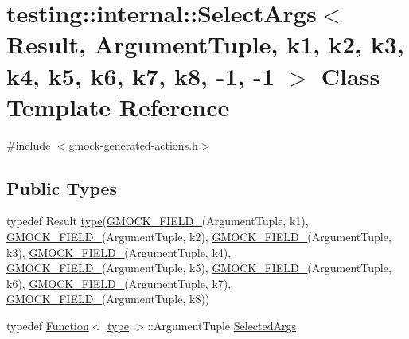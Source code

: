 \hypertarget{classtesting_1_1internal_1_1_select_args_3_01_result_00_01_argument_tuple_00_01k1_00_01k2_00_01ke29a32f440a8fcb098d8685a265f9f40}{}\section{testing\+:\+:internal\+:\+:Select\+Args$<$ Result, Argument\+Tuple, k1, k2, k3, k4, k5, k6, k7, k8, -\/1, -\/1 $>$ Class Template Reference}
\label{classtesting_1_1internal_1_1_select_args_3_01_result_00_01_argument_tuple_00_01k1_00_01k2_00_01ke29a32f440a8fcb098d8685a265f9f40}


{\ttfamily \#include $<$gmock-\/generated-\/actions.\+h$>$}

\subsection*{Public Types}
\begin{DoxyCompactItemize}
\item 
typedef Result \hyperlink{classtesting_1_1internal_1_1_select_args_3_01_result_00_01_argument_tuple_00_01k1_00_01k2_00_01ke29a32f440a8fcb098d8685a265f9f40_a098037b4b2ed4c33121d2e0f1967acbf}{type}(\hyperlink{gmock-generated-actions_8h_a6eb3ce92b0613603057a20ec9e593317}{G\+M\+O\+C\+K\+\_\+\+F\+I\+E\+L\+D\+\_\+}(Argument\+Tuple, k1), \hyperlink{gmock-generated-actions_8h_a6eb3ce92b0613603057a20ec9e593317}{G\+M\+O\+C\+K\+\_\+\+F\+I\+E\+L\+D\+\_\+}(Argument\+Tuple, k2), \hyperlink{gmock-generated-actions_8h_a6eb3ce92b0613603057a20ec9e593317}{G\+M\+O\+C\+K\+\_\+\+F\+I\+E\+L\+D\+\_\+}(Argument\+Tuple, k3), \hyperlink{gmock-generated-actions_8h_a6eb3ce92b0613603057a20ec9e593317}{G\+M\+O\+C\+K\+\_\+\+F\+I\+E\+L\+D\+\_\+}(Argument\+Tuple, k4), \hyperlink{gmock-generated-actions_8h_a6eb3ce92b0613603057a20ec9e593317}{G\+M\+O\+C\+K\+\_\+\+F\+I\+E\+L\+D\+\_\+}(Argument\+Tuple, k5), \hyperlink{gmock-generated-actions_8h_a6eb3ce92b0613603057a20ec9e593317}{G\+M\+O\+C\+K\+\_\+\+F\+I\+E\+L\+D\+\_\+}(Argument\+Tuple, k6), \hyperlink{gmock-generated-actions_8h_a6eb3ce92b0613603057a20ec9e593317}{G\+M\+O\+C\+K\+\_\+\+F\+I\+E\+L\+D\+\_\+}(Argument\+Tuple, k7), \hyperlink{gmock-generated-actions_8h_a6eb3ce92b0613603057a20ec9e593317}{G\+M\+O\+C\+K\+\_\+\+F\+I\+E\+L\+D\+\_\+}(Argument\+Tuple, k8))
\item 
typedef \hyperlink{structtesting_1_1internal_1_1_function}{Function}$<$ \hyperlink{classtesting_1_1internal_1_1_select_args_3_01_result_00_01_argument_tuple_00_01k1_00_01k2_00_01ke29a32f440a8fcb098d8685a265f9f40_a098037b4b2ed4c33121d2e0f1967acbf}{type} $>$\+::Argument\+Tuple \hyperlink{classtesting_1_1internal_1_1_select_args_3_01_result_00_01_argument_tuple_00_01k1_00_01k2_00_01ke29a32f440a8fcb098d8685a265f9f40_a964de7fbb2ffb6acf0d7d80528cda6ba}{Selected\+Args}
\end{DoxyCompactItemize}
